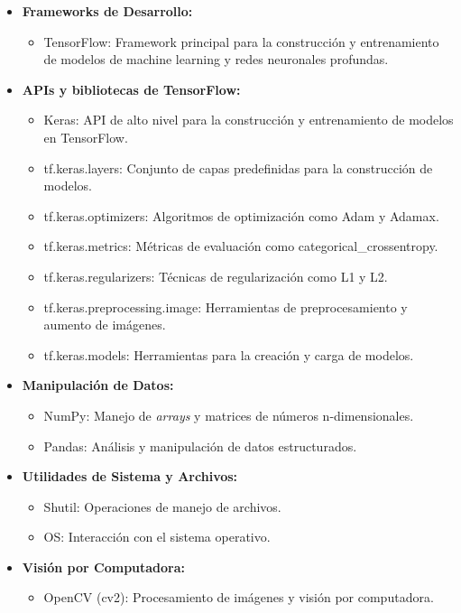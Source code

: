 \begin{itemize}
   \item \textbf{Frameworks de Desarrollo:}
   \begin{itemize}
       \item TensorFlow: Framework principal para la construcción y entrenamiento de modelos de machine learning y redes neuronales profundas.
   \end{itemize}

   \item \textbf{APIs y bibliotecas de TensorFlow:}
   \begin{itemize}
       \item Keras: API de alto nivel para la construcción y entrenamiento de modelos en TensorFlow.
       \item tf.keras.layers: Conjunto de capas predefinidas para la construcción de modelos.
       \item tf.keras.optimizers: Algoritmos de optimización como Adam y Adamax.
       \item tf.keras.metrics: Métricas de evaluación como categorical\_crossentropy.
       \item tf.keras.regularizers: Técnicas de regularización como L1 y L2.
       \item tf.keras.preprocessing.image: Herramientas de preprocesamiento y aumento de imágenes.
       \item tf.keras.models: Herramientas para la creación y carga de modelos.
   \end{itemize}

   \item \textbf{Manipulación de Datos:}
   \begin{itemize}
       \item NumPy: Manejo de \textit{arrays} y matrices de números n-dimensionales.
       \item Pandas: Análisis y manipulación de datos estructurados.
   \end{itemize}

   \item \textbf{Utilidades de Sistema y Archivos:}
   \begin{itemize}
       \item Shutil: Operaciones de manejo de archivos.
       \item OS: Interacción con el sistema operativo.
   \end{itemize}

   \item \textbf{Visión por Computadora:}
   \begin{itemize}
       \item OpenCV (cv2): Procesamiento de imágenes y visión por computadora.
   \end{itemize}


\end{itemize}

